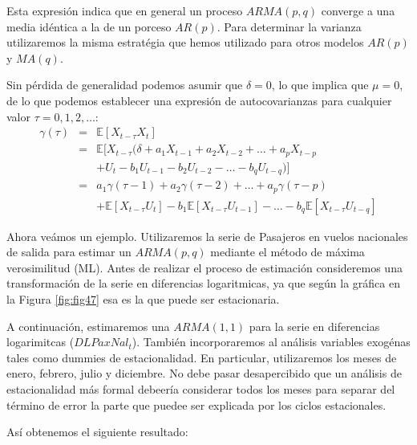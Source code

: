 \documentclass[
]{book}
\begin{document}
Esta expresión indica que en general un proceso \(ARMA(p, q)\) converge a una media idéntica a la de un porceso \(AR(p)\). Para determinar la varianza utilizaremos la misma estratégia que hemos utilizado para otros modelos \(AR(p)\) y \(MA(q)\).

Sin pérdida de generalidad podemos asumir que \(\delta = 0\), lo que implica que \(\mu = 0\), de lo que podemos establecer una expresión de autocovarianzas para cualquier valor \(\tau = 0, 1, 2, \ldots\):
\begin{eqnarray}
    \gamma(\tau) & = & \mathbb{E}[X_{t-\tau} X_t] \nonumber \\
    & = & \mathbb{E}[X_{t-\tau} (\delta + a_1 X_{t - 1} + a_2 X_{t - 2} + \ldots + a_p X_{t - p} \nonumber \\
    &   & + U_t - b_1 U_{t - 1} - b_2  U_{t - 2} - \ldots - b_q  U_{t - q})] \nonumber \\
    & = & a_1 \gamma(\tau - 1) + a_2 \gamma(\tau - 2) + \ldots + a_p \gamma(\tau - p) \nonumber \\
    &   & + \mathbb{E}[X_{t-\tau} U_{t}] - b_1  \mathbb{E}[X_{t-\tau} U_{t-1}] - \ldots  - b_q  \mathbb{E}[X_{t-\tau} U_{t-q}] 
\end{eqnarray}

Ahora veámos un ejemplo. Utilizaremos la serie de Pasajeros en vuelos nacionales de salida para estimar un \(ARMA(p, q)\) mediante el método de máxima verosimilitud (ML). Antes de realizar el proceso de estimación consideremos una transformación de la serie en diferencias logaritmicas, ya que según la gráfica en la Figura \ref{fig:fig47} esa es la que puede ser estacionaria.

A continuación, estimaremos una \(ARMA(1, 1)\) para la serie en diferencias logarimitcas (\(DLPaxNal_t\)). También incorporaremos al análisis variables exogénas tales como dummies de estacionalidad. En particular, utilizaremos los meses de enero, febrero, julio y diciembre. No debe pasar desapercibido que un análisis de estacionalidad más formal debeería considerar todos los meses para separar del término de error la parte que puedee ser explicada por los ciclos estacionales.

Así obtenemos el siguiente resultado:
\end{document}
